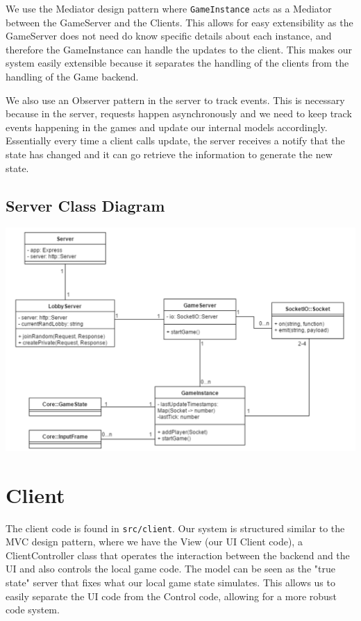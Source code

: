 \documentclass[12pt]{report}
\begin{document}
We use the Mediator design pattern where \texttt{GameInstance} acts as a Mediator between the GameServer and the Clients. This allows for easy extensibility as the GameServer does not need do know specific details about each instance, and therefore the GameInstance can handle the updates to the client. This makes our system easily extensible because it separates the handling of the clients from the handling of the Game backend. 

We also use an Observer pattern in the server to track events. This is necessary because in the server, requests happen asynchronously and we need to keep track events happening in the games and update our internal models accordingly. Essentially every time a client calls update, the server receives a notify that the state has changed and it can go retrieve the information to generate the new state. 

\subsection{Server Class Diagram}
\includegraphics[width=\linewidth]{images/server_classes.png}

\section{Client}

The client code is found in \texttt{src/client}. Our system is structured similar to the MVC design pattern, where we have the View (our UI Client code), a ClientController class that operates the interaction between the backend and the UI and also controls the local game code. The model can be seen as the "true state" server that fixes what our local game state simulates. This allows us to easily separate the UI code from the Control code, allowing for a more robust code system. 
\end{document}
